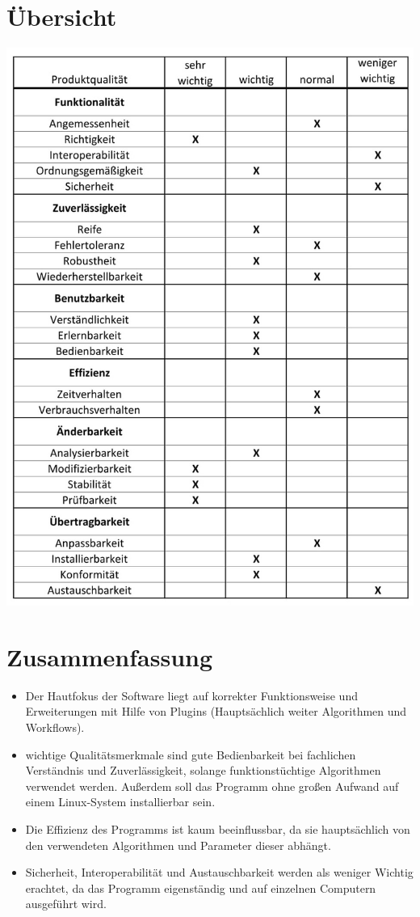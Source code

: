 \section{Übersicht}
\includegraphics[scale=0.5]{img/Quali.jpg} 
\section{Zusammenfassung}
\begin{itemize}
\item Der Hautfokus der Software liegt auf korrekter Funktionsweise und Erweiterungen mit Hilfe von Plugins (Hauptsächlich weiter Algorithmen und Workflows).  
\item wichtige Qualitätsmerkmale sind gute Bedienbarkeit bei fachlichen Verständnis und Zuverlässigkeit, solange funktionstüchtige Algorithmen verwendet werden. Außerdem soll das Programm ohne großen Aufwand auf einem Linux-System installierbar sein.
\item Die Effizienz des Programms ist kaum beeinflussbar, da sie hauptsächlich von den verwendeten Algorithmen und Parameter dieser abhängt.
\item Sicherheit, Interoperabilität und Austauschbarkeit werden als weniger Wichtig erachtet, da das Programm eigenständig und auf einzelnen Computern ausgeführt wird.
\end{itemize}